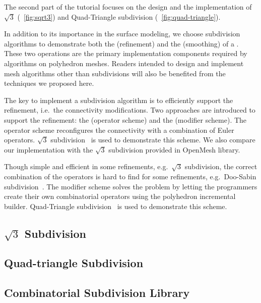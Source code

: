 The second part of the tutorial focuses on the design and the
implementation of $\sqrt{3}$ (\figurename\ \ref{fig:sqrt3}) and
Quad-Triangle subdivision (\figurename\ \ref{fig:quad-triangle}).

In addition to its importance in the surface modeling, we choose
subdivision algorithms to demonstrate both the
 (refinement) and the
 (smoothing) of a
\cgalpoly . These two operations are the
primary implementation components required by algorithms on polyhedron
meshes. Readers intended to design and implement mesh algorithms other
than subdivisions will also be benefited from the techniques we
proposed here.

The key to implement a subdivision algorithm is to efficiently support
the refinement, i.e.\ the connectivity modifications. Two approaches
are introduced to support the refinement: the 
(operator scheme) and the 
(modifier scheme).  The operator scheme reconfigures the connectivity
with a combination of Euler operators. $\sqrt{3}$
subdivision~\cite{sqrt3} is used to demonstrate this scheme. We also
compare our implementation with the $\sqrt{3}$ subdivision provided in
OpenMesh library.

Though simple and efficient in some refinements, e.g.\ $\sqrt{3}$
subdivision, the correct combination of the operators is hard to find
for some refinements, e.g.\ Doo-Sabin subdivision~\cite{ds}. The
modifier scheme solves the problem by letting the programmers create
their own combinatorial operators using the polyhedron incremental
builder. Quad-Triangle subdivision~\cite{qts,l-pg-03} is used to
demonstrate this scheme.

\subsection{$\sqrt{3}$ Subdivision}


\subsection{Quad-triangle Subdivision}


\subsection{Combinatorial Subdivision Library}


